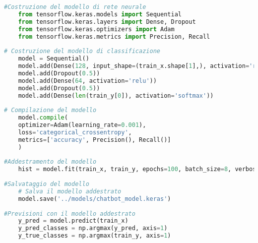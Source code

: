 \begin{lstlisting}[language=Python, caption=Utilizzo di TensorFlow e Keras nel codice]
#Costruzione del modello di rete neurale
	from tensorflow.keras.models import Sequential
	from tensorflow.keras.layers import Dense, Dropout
	from tensorflow.keras.optimizers import Adam
	from tensorflow.keras.metrics import Precision, Recall
	
# Costruzione del modello di classificazione
	model = Sequential()
	model.add(Dense(128, input_shape=(train_x.shape[1],), activation='relu'))
	model.add(Dropout(0.5))
	model.add(Dense(64, activation='relu'))
	model.add(Dropout(0.5))
	model.add(Dense(len(train_y[0]), activation='softmax'))
	
# Compilazione del modello
	model.compile(
	optimizer=Adam(learning_rate=0.001),
	loss='categorical_crossentropy',
	metrics=['accuracy', Precision(), Recall()]
	)
	
#Addestramento del modello 
	hist = model.fit(train_x, train_y, epochs=100, batch_size=8, verbose=1)
	
#Salvataggio del modello
	# Salva il modello addestrato
	model.save('../models/chatbot_model.keras')
	
#Previsioni con il modello addestrato
	y_pred = model.predict(train_x)
	y_pred_classes = np.argmax(y_pred, axis=1)
	y_true_classes = np.argmax(train_y, axis=1)
\end{lstlisting}